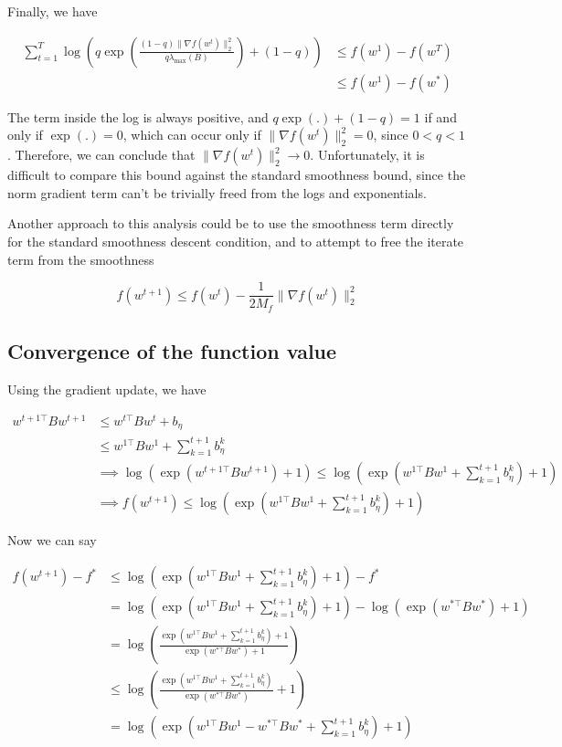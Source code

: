 \documentclass[11pt]{article}
\begin{document}
Finally, we have

\begin{align*}
    \sum_{t=1}^{T} \log \left( q \exp \left( \frac{(1-q) \| \nabla f(w^t) \|_2^2}{q \lambda_{\max}(B)} \right) + (1-q) \right) &\leq f(w^1) - f(w^{T}) \\
    &\leq f(w^1) - f(w^{*})
\end{align*}

The term inside the log is always positive, and $q \exp(.) + (1-q) = 1$ if and only if $\exp(.) = 0$, which can occur only if $\| \nabla f(w^t) \|_2^2 = 0$, since $0 < q < 1$. Therefore, we can conclude that $\| \nabla f(w^t) \|_2^2 \rightarrow 0$. Unfortunately, it is difficult to compare this bound against the standard smoothness bound, since the norm gradient term can't be trivially freed from the logs and exponentials.

Another approach to this analysis could be to use the smoothness term directly for the standard smoothness descent condition, and to attempt to free the iterate term from the smoothness

\begin{equation}
    f(w^{t+1}) \leq f(w^t) - \frac{1}{2M_f}\| \nabla f(w^t) \|_2^2
\end{equation}

\subsection{Convergence of the function value}

Using the gradient update, we have

\begin{align*}
    w^{t+1\top}Bw^{t+1} &\leq w^{t\top}Bw^{t} + b_\eta \\
    &\leq w^{1\top}Bw^{1} + \sum_{k=1}^{t+1} b_\eta^k \\
    &\implies \log( \exp(w^{t+1\top}Bw^{t+1}) + 1) \leq \log( \exp(w^{1\top}Bw^{1} + \sum_{k=1}^{t+1} b_\eta^k) + 1) \\
    &\implies f(w^{t+1}) \leq \log( \exp(w^{1\top}Bw^{1} + \sum_{k=1}^{t+1} b_\eta^k) + 1)
\end{align*}

Now we can say

\begin{align*}
    f(w^{t+1}) - f^* &\leq \log( \exp(w^{1\top}Bw^{1} + \sum_{k=1}^{t+1} b_\eta^k) + 1) - f^* \\
    &= \log( \exp(w^{1\top}Bw^{1} + \sum_{k=1}^{t+1} b_\eta^k) + 1) - \log( \exp(w^{*\top}Bw^{*}) + 1) \\
    &= \log \left( \frac{\exp(w^{1\top}Bw^{1} + \sum_{k=1}^{t+1} b_\eta^k) + 1}{\exp(w^{*\top}Bw^{*}) + 1} \right) \\
    &\leq \log \left( \frac{\exp(w^{1\top}Bw^{1} + \sum_{k=1}^{t+1} b_\eta^k)}{\exp(w^{*\top}Bw^{*})} + 1 \right) \\
    &= \log \left( \exp \left(w^{1\top}Bw^{1} - w^{*\top}Bw^{*} + \sum_{k=1}^{t+1} b_\eta^k \right) + 1 \right)
\end{align*}
\end{document}
